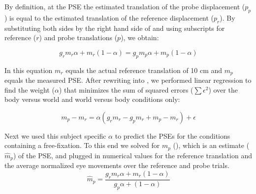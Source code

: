 By definition, at the PSE the estimated translation of the probe displacement ($p_p$) is equal to the estimated translation of the reference displacement ($p_r$). By substituting both sides by the right hand side of  and using subscripts for reference ($r$) and probe translations ($p$), we obtain:

\begin{equation}
\label{p3:eq3}
g_r m_r \alpha + m_r (1 - \alpha) = g_p m_p \alpha + m_p (1 - \alpha)
\end{equation}

In this equation $m_r$ equals the actual reference translation of 10 cm and $m_p$ equals the measured PSE. After rewriting  into , we performed linear regression to find the weight ($\alpha$) that minimizes the sum of squared errors ($\sum{\epsilon^2}$) over the body versus world and world versus body conditions only:

\begin{equation}
\label{p3:eq4}
m_p - m_r = \alpha ( g_r m_r - g_p m_r + m_p - m_r ) + \epsilon
\end{equation}

Next we used this subject specific $\alpha$ to predict the PSEs for the conditions containing a free-fixation. To this end we solved  for $m_p$ (), which is an estimate ($\hat{m}_p$) of the PSE, and plugged in numerical values for the reference translation and the average normalized eye movements over the reference and probe trials.
                                                                                            \begin{equation}
\label{p3:eq5}
\hat{m}_p = \frac
	{g_r m_r \alpha + m_r (1 - \alpha)}
	{g_p \alpha + (1 - \alpha)}
\end{equation}

